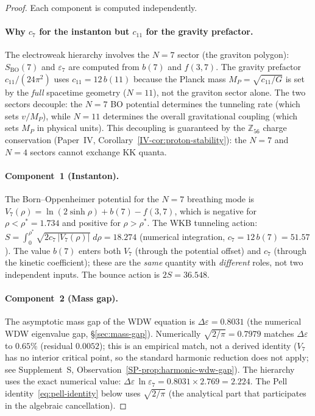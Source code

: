 \begin{proof}
Each component is computed independently.

\paragraph{Why $c_7$ for the instanton but $c_{11}$ for the gravity
prefactor.}
The electroweak hierarchy involves the $N = 7$ sector
(the graviton polygon): $S_{\mathrm{BO}}(7)$ and $\varepsilon_7$
are computed from $b(7)$ and $f(3,7)$.
The gravity prefactor $c_{11}/(24\pi^2)$ uses
$c_{11} = 12\,b(11)$ because the Planck mass
$M_P = \sqrt{c_{11}/G}$ is set by the \emph{full} spacetime
geometry ($N = 11$), not the graviton sector alone.
The two sectors decouple: the $N = 7$ BO potential determines
the tunneling rate (which sets $v/M_P$), while $N = 11$
determines the overall gravitational coupling (which sets
$M_P$ in physical units).
This decoupling is guaranteed by the $\mathbb{Z}_{56}$
charge conservation (Paper~IV, Corollary~\ref*{IV-cor:proton-stability}):
the $N = 7$ and $N = 4$ sectors cannot exchange KK quanta.

\paragraph{Component~1 (Instanton).}
The Born--Oppenheimer potential for the $N = 7$ breathing mode is
$V_7(\rho) = \ln(2\sinh\rho) + b(7) - f(3,7)$,
which is negative for $\rho < \rho^* = 1.734$
and positive for $\rho > \rho^*$.
The WKB tunneling action:
$S = \int_0^{\rho^*} \sqrt{2c_7\,|V_7(\rho)|}\;d\rho = 18.274$
(numerical integration, $c_7 = 12\,b(7) = 51.57$).
The value $b(7)$ enters both $V_7$ (through the potential offset)
and $c_7$ (through the kinetic coefficient); these are the
\emph{same} quantity with \emph{different} roles, not
two independent inputs.
The bounce action is $2S = 36.548$.

\paragraph{Component~2 (Mass gap).}
The asymptotic mass gap of the WDW equation is
$\Delta\varepsilon = 0.8031$
(the numerical WDW eigenvalue gap, \S\ref{sec:mass-gap}).
Numerically $\sqrt{2/\pi} = 0.7979$ matches $\Delta\varepsilon$
to $0.65\%$ (residual $0.0052$); this is an empirical match,
not a derived identity ($V_7$ has no interior critical point,
so the standard harmonic reduction does not apply;
see Supplement~S, Observation~\ref*{SP-prop:harmonic-wdw-gap}).
The hierarchy uses the exact numerical value:
$\Delta\varepsilon\,\ln\varepsilon_7 = 0.8031 \times 2.769 = 2.224$.
The Pell identity~\eqref{eq:pell-identity} below uses
$\sqrt{2/\pi}$ (the analytical part that participates
in the algebraic cancellation).


\end{proof}
